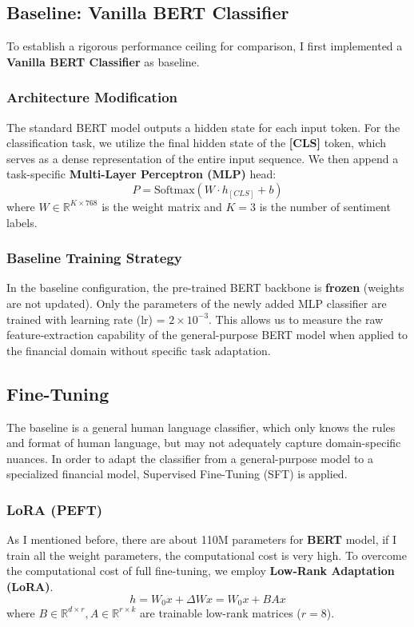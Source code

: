 \documentclass[a4paper, 12pt, twoside]{article}
\begin{document}
\subsection{Baseline: Vanilla BERT Classifier}
To establish a rigorous performance ceiling for comparison, I first implemented a \textbf{Vanilla BERT Classifier} as baseline.

\subsubsection{Architecture Modification}
The standard BERT model outputs a hidden state for each input token. For the classification task, we utilize the final hidden state of the \textbf{[CLS]} token, which serves as a dense representation of the entire input sequence. We then append a task-specific \textbf{Multi-Layer Perceptron (MLP)} head:
\begin{equation}
    P = \text{Softmax}(W \cdot h_{[CLS]} + b)
\end{equation}
where $W \in \mathbb{R}^{K \times 768}$ is the weight matrix and $K=3$ is the number of sentiment labels.
\subsubsection{Baseline Training Strategy}
In the baseline configuration, the pre-trained BERT backbone is \textbf{frozen} (weights are not updated). Only the parameters of the newly added MLP classifier are trained with learning rate (lr) = $2\times 10^{-3}$. This allows us to measure the raw feature-extraction capability of the general-purpose BERT model when applied to the financial domain without specific task adaptation.
\subsection{Fine-Tuning}
The baseline is a general human language classifier, which only knows the rules and format of human language, but may not adequately capture domain-specific nuances. In order to adapt the classifier from a general-purpose model to a specialized financial model, Supervised Fine-Tuning (SFT) is applied.
\subsubsection{LoRA (PEFT)}
As I mentioned before, there are about 110M parameters for \textbf{BERT} model, if I train all the weight parameters, the computational cost is very high. To overcome the computational cost of full fine-tuning, we employ \textbf{Low-Rank Adaptation (LoRA)}. 
\begin{equation}
    h = W_0x + \Delta Wx = W_0x + BAx
\end{equation}
where $B \in \mathbb{R}^{d \times r}, A \in \mathbb{R}^{r \times k}$ are trainable low-rank matrices ($r=8$).
\end{document}
